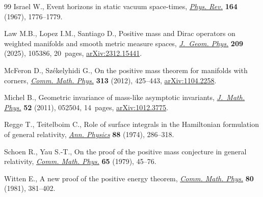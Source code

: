 \documentclass[10pt,a4paper]{amsart}
\numberwithin{equation}{section}
\theoremstyle{definition}
\begin{document}
\begin{thebibliography}{99}
Israel W., Event horizons in static vacuum space-times,
 \href{https://doi.org/10.1103/PhysRev.164.1776}{\textit{Phys. Rev.}}
 \textbf{164} (1967), 1776--1779.

Law M.B., Lopez I.M., Santiago D., Positive mass and {D}irac operators on
 weighted manifolds and smooth metric measure spaces,
 \href{https://doi.org/10.1016/j.geomphys.2024.105386}{\textit{J.~Geom.
 Phys.}} \textbf{209} (2025), 105386, 20~pages,
 \href{http://arxiv.org/abs/2312.15441}{arXiv:2312.15441}.

McFeron D., Sz\'{e}kelyhidi G., On the positive mass theorem for manifolds with
 corners, \href{https://doi.org/10.1007/s00220-012-1498-8}{\textit{Comm. Math.
 Phys.}} \textbf{313} (2012), 425--443,
 \href{http://arxiv.org/abs/1104.2258}{arXiv:1104.2258}.

Michel B., Geometric invariance of mass-like asymptotic invariants,
 \href{https://doi.org/10.1063/1.3579137}{\textit{J.~Math. Phys.}} \textbf{52}
 (2011), 052504, 14~pages,
 \href{http://arxiv.org/abs/1012.3775}{arXiv:1012.3775}.

Regge T., Teitelboim C., Role of surface integrals in the {H}amiltonian
 formulation of general relativity,
 \href{https://doi.org/10.1016/0003-4916(74)90404-7}{\textit{Ann. Physics}}
 \textbf{88} (1974), 286--318.

Schoen R., Yau S.-T., On the proof of the positive mass conjecture in general
 relativity, \href{https://doi.org/10.1007/BF01940959}{\textit{Comm. Math.
 Phys.}} \textbf{65} (1979), 45--76.

Witten E., A new proof of the positive energy theorem,
 \href{https://doi.org/10.1007/BF01208277}{\textit{Comm. Math. Phys.}}
 \textbf{80} (1981), 381--402.

\end{thebibliography}
\end{document}
